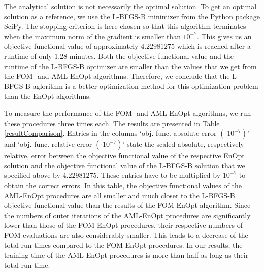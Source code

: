 The analytical solution is not necessarily the optimal solution. To get an optimal solution as a reference, we use the L-BFGS-B minimizer \cite{doi:10.1137/0916069, 10.1145/279232.279236, 10.1145/2049662.2049669} from the Python package SciPy. The stopping criterion is here chosen so that this algorithm terminates when the maximum norm of the gradient is smaller than $10^{-7}$. This gives us an objective functional value of approximately $4.22981275$ which is reached after a runtime of only $1.28$ minutes. Both the objective functional value and the runtime of the L-BFGS-B optimizer are smaller than the values that we get from the FOM- and AML-EnOpt algorithms. Therefore, we conclude that the L-BFGS-B aglorithm is a better optimization method for this optimization problem than the EnOpt algorithms.

To measure the performance of the FOM- and AML-EnOpt algorithms, we run these procedures three times each. The results are presented in Table \ref{resultComparison}. Entries in the columns `obj. func. absolute error $(\cdot 10^{-7})$' and `obj. func. relative error $(\cdot 10^{-7})$' state the scaled absolute, respectively relative, error between the objective functional value of the respective EnOpt solution and the objective functional value of the L-BFGS-B solution that we specified above by $4.22981275$. These entries have to be multiplied by $10^{-7}$ to obtain the correct errors. In this table, the objective functional values of the AML-EnOpt procedures are all smaller and much closer to the L-BFGS-B objective functional value than the results of the FOM-EnOpt algorithm. Since the numbers of outer iterations of the AML-EnOpt procedures are significantly lower than those of the FOM-EnOpt procedures, their respective numbers of FOM evaluations are also considerably smaller. This leads to a decrease of the total run times compared to the FOM-EnOpt procedures. In our results, the training time of the AML-EnOpt procedures is more than half as long as their total run time.\\

